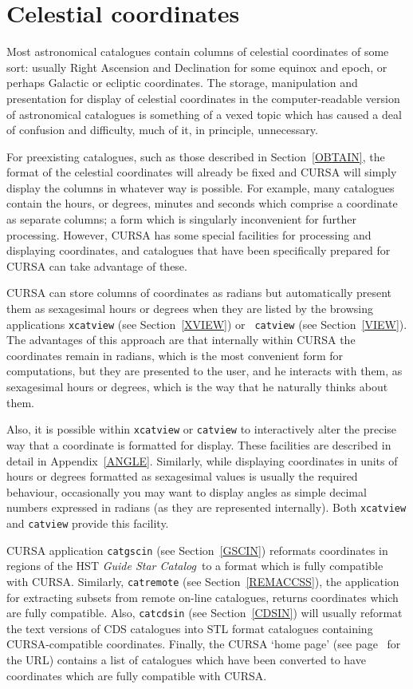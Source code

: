 \documentclass[twoside,11pt]{article}
\newcommand{\htmladdnormallink}[2]{#1}
\newcommand{\xlabel}[1]{}
\renewcommand{\_}{\texttt{\symbol{95}}}
\begin{document}
\section{\xlabel{CELCOORD}\label{CELCOORD}Celestial coordinates}

Most astronomical catalogues contain columns of celestial
coordinates of some sort: usually Right Ascension and
Declination for some equinox and epoch, or perhaps Galactic or
ecliptic coordinates. The storage, manipulation and presentation
for display of celestial coordinates in the computer-readable
version of astronomical catalogues is something of a vexed topic
which has caused a deal of confusion and difficulty, much of it,
in principle, unnecessary.

For preexisting catalogues, such as those described in
Section~\ref{OBTAIN}, the format of the celestial
coordinates will already be fixed and CURSA will simply display the
columns in whatever way is possible. For example, many catalogues
contain the hours, or degrees, minutes and seconds which
comprise a coordinate as separate columns; a form which is
singularly inconvenient for further processing. However, CURSA has
some special facilities for processing and displaying coordinates, and
catalogues that have been specifically prepared for CURSA can take
advantage of these.

CURSA can store columns of coordinates as radians but automatically
present them as sexagesimal hours or degrees when they are listed by the
browsing applications {\tt xcatview} (see Section~\ref{XVIEW}) or {\tt
catview} (see Section~\ref{VIEW}). The advantages of this approach are
that internally within CURSA the coordinates remain in radians, which is
the most convenient form for computations, but they are presented to the
user, and he interacts with them, as sexagesimal hours or degrees, which
is the way that he naturally thinks about them.

Also, it is possible within {\tt xcatview} or {\tt catview} to
interactively alter the precise way that a coordinate is formatted for
display. These facilities are described in detail in
Appendix~\ref{ANGLE}. Similarly, while displaying coordinates in units of
hours or degrees formatted as sexagesimal values is usually the required
behaviour, occasionally you may want to display angles as simple decimal
numbers expressed in radians (as they are represented internally). Both
{\tt xcatview} and {\tt catview} provide this facility.

CURSA application {\tt catgscin} (see Section~\ref{GSCIN}) reformats
coordinates in regions of the HST {\it Guide Star Catalog}\, to a
format which is fully compatible with CURSA.  Similarly, {\tt catremote}
(see Section~\ref{REMACCSS}), the application for extracting subsets
from remote on-line catalogues, returns coordinates which are fully
compatible.  Also, {\tt catcdsin} (see Section~\ref{CDSIN}) will
usually reformat the text versions of CDS catalogues into STL format
catalogues containing CURSA-compatible coordinates.  Finally, the CURSA
`\htmladdnormallink{home page}{http://www.starlink.ac.uk/cursa/}'
(see page~\pageref{HOMEPAGE} for the URL) contains a list of catalogues
which have been converted to have coordinates which are fully compatible
with CURSA.
\end{document}
